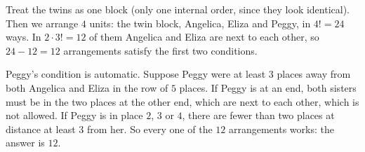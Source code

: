 Treat the twins as one block (only one internal order, since they look identical). Then we arrange $4$ units: the twin block, Angelica, Eliza and Peggy, in $4!=24$ ways. In $2\cdot3!=12$ of them Angelica and Eliza are next to each other, so $24-12=12$ arrangements satisfy the first two conditions.

Peggy's condition is automatic. Suppose Peggy were at least $3$ places away from both Angelica and Eliza in the row of $5$ places. If Peggy is at an end, both sisters must be in the two places at the other end, which are next to each other, which is not allowed. If Peggy is in place $2$, $3$ or $4$, there are fewer than two places at distance at least $3$ from her. So every one of the $12$ arrangements works: the answer is $\boxed{12}$.
